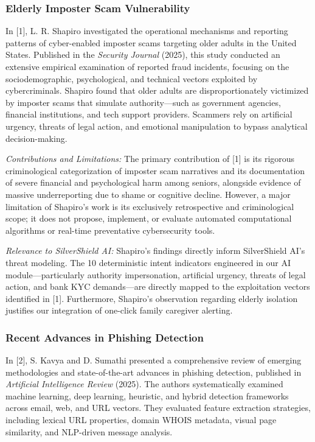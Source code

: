 \documentclass[conference]{IEEEtran}
\begin{document}
\subsubsection{Elderly Imposter Scam Vulnerability}
In [1], L. R. Shapiro investigated the operational mechanisms and reporting patterns of cyber-enabled imposter scams targeting older adults in the United States. Published in the \textit{Security Journal} (2025), this study conducted an extensive empirical examination of reported fraud incidents, focusing on the sociodemographic, psychological, and technical vectors exploited by cybercriminals. Shapiro found that older adults are disproportionately victimized by imposter scams that simulate authority---such as government agencies, financial institutions, and tech support providers. Scammers rely on artificial urgency, threats of legal action, and emotional manipulation to bypass analytical decision-making. 

\textit{Contributions and Limitations:} The primary contribution of [1] is its rigorous criminological categorization of imposter scam narratives and its documentation of severe financial and psychological harm among seniors, alongside evidence of massive underreporting due to shame or cognitive decline. However, a major limitation of Shapiro's work is its exclusively retrospective and criminological scope; it does not propose, implement, or evaluate automated computational algorithms or real-time preventative cybersecurity tools. 

\textit{Relevance to SilverShield AI:} Shapiro's findings directly inform SilverShield AI's threat modeling. The 10 deterministic intent indicators engineered in our AI module---particularly authority impersonation, artificial urgency, threats of legal action, and bank KYC demands---are directly mapped to the exploitation vectors identified in [1]. Furthermore, Shapiro's observation regarding elderly isolation justifies our integration of one-click family caregiver alerting.

\subsubsection{Recent Advances in Phishing Detection}
In [2], S. Kavya and D. Sumathi presented a comprehensive review of emerging methodologies and state-of-the-art advances in phishing detection, published in \textit{Artificial Intelligence Review} (2025). The authors systematically examined machine learning, deep learning, heuristic, and hybrid detection frameworks across email, web, and URL vectors. They evaluated feature extraction strategies, including lexical URL properties, domain WHOIS metadata, visual page similarity, and NLP-driven message analysis.
\end{document}
